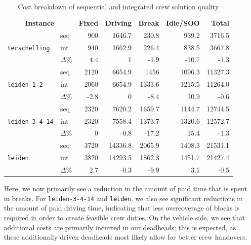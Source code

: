 \documentclass[]{article}
\begin{document}
\begin{table}[h]
  \centering
  \begin{tabular}{llrrrrr}
    \toprule
    \multicolumn{2}{c}{\textbf{Instance}} & \textbf{Fixed} & \textbf{Driving} & \textbf{Break} & \textbf{Idle/SOO} & \textbf{Total} \\
    \cmidrule(lr){1-2} \cmidrule(lr){3-7}
    \multirow{3}{*}{\texttt{terschelling}}  & seq        & 900 & 1646.7 & 230.8 &	939.2 & 3716.5 \\
                                            & int        & 940 & 1662.9 &	226.4 &	838.5 & 3667.8 \\ 
                                            & $\Delta\%$ & 4.4	& 1 &	-1.9 & -10.7& -1.3    \\
    \multirow{3}{*}{\texttt{leiden-1-2}}    & seq        & 2120	& 6654.9 &	1456&	1096.3 & 11327.3 \\
                                            & int        & 2060	& 6654.9& 1333.6 &	1215.5 & 11264.0 \\ 
                                            & $\Delta\%$ & -2.8	& 0	    & -8.4 & 10.9	 & -0.6    \\
    \multirow{3}{*}{\texttt{leiden-3-4-14}} & seq        & 2320 &	7620.2 &	1659.7 &	1144.7 & 12744.5 \\
                                            & int        & 2320 &	7558.4 &	1373.7 &	1320.6 & 12572.7 \\ 
                                            & $\Delta\%$ & 0	& -0.8	& -17.2	& 15.4 &	-1.3  \\
    \multirow{3}{*}{\texttt{leiden}}        & seq        & 3720	& 14336.8 &	2065.9 & 1408.3 & 21531.1 \\
                                            & int        & 3820	& 14293.5 &	1862.3 &	1451.7 & 21427.4 \\ 
                                            & $\Delta\%$ & 2.7 &	-0.3 &	-9.9 &	3.1 &	-0.5 \\
    \bottomrule
  \end{tabular}
  \caption{Cost breakdown of sequential and integrated crew solution quality}
  \label{tab:seq-vs-int-breakdown-crew}
\end{table}

Here, we now primarily see a reduction in the amount of paid time that is spent in breaks. For \texttt{leiden-3-4-14} and \texttt{leiden}, we also see significant reductions in the amount of paid driving time, indicating that less overcoverage of blocks is required in order to create feasible crew duties. On the vehicle side, we see that additional costs are primarily incurred in our deadheads; this is expected, as these additionally driven deadheads most likely allow for better crew handovers. 
\end{document}
